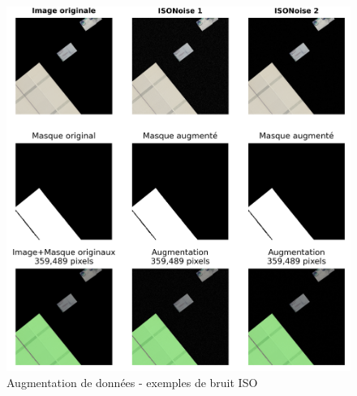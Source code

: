 \begin{figure}[H]
    \centering
    \includegraphics[width=1\linewidth]{02-main/figures/ch3/ch36_augmentations_09_bruit_iso.png}
    \caption{Augmentation de données - exemples de bruit ISO}
    \label{fig:ch36_augmentations_09_bruit_iso}
\end{figure}

